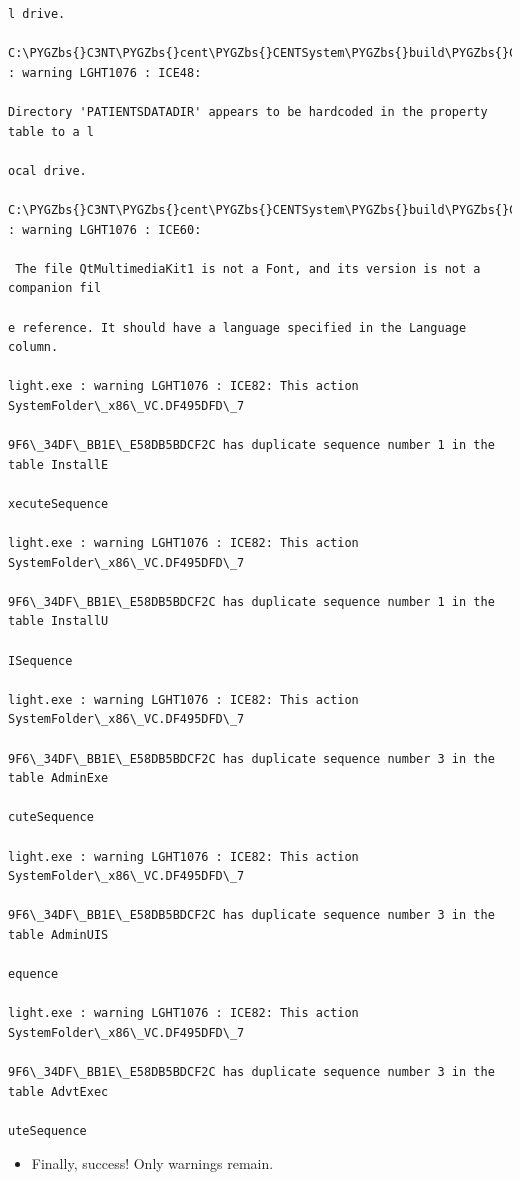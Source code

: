 \documentclass[letterpaper,10pt,english]{sphinxmanual}
\def\PYGZbs{\char`\\}
\begin{document}
\begin{enumerate}
\begin{description}
\begin{Verbatim}[commandchars=\\\{\}]
l drive.

C:\PYGZbs{}C3NT\PYGZbs{}cent\PYGZbs{}CENTSystem\PYGZbs{}build\PYGZbs{}CENTInstaller.wxs(60) : warning LGHT1076 : ICE48:

Directory 'PATIENTSDATADIR' appears to be hardcoded in the property table to a l

ocal drive.

C:\PYGZbs{}C3NT\PYGZbs{}cent\PYGZbs{}CENTSystem\PYGZbs{}build\PYGZbs{}CENTInstaller.wxs(127) : warning LGHT1076 : ICE60:

 The file QtMultimediaKit1 is not a Font, and its version is not a companion fil

e reference. It should have a language specified in the Language column.

light.exe : warning LGHT1076 : ICE82: This action SystemFolder\_x86\_VC.DF495DFD\_7

9F6\_34DF\_BB1E\_E58DB5BDCF2C has duplicate sequence number 1 in the table InstallE

xecuteSequence

light.exe : warning LGHT1076 : ICE82: This action SystemFolder\_x86\_VC.DF495DFD\_7

9F6\_34DF\_BB1E\_E58DB5BDCF2C has duplicate sequence number 1 in the table InstallU

ISequence

light.exe : warning LGHT1076 : ICE82: This action SystemFolder\_x86\_VC.DF495DFD\_7

9F6\_34DF\_BB1E\_E58DB5BDCF2C has duplicate sequence number 3 in the table AdminExe

cuteSequence

light.exe : warning LGHT1076 : ICE82: This action SystemFolder\_x86\_VC.DF495DFD\_7

9F6\_34DF\_BB1E\_E58DB5BDCF2C has duplicate sequence number 3 in the table AdminUIS

equence

light.exe : warning LGHT1076 : ICE82: This action SystemFolder\_x86\_VC.DF495DFD\_7

9F6\_34DF\_BB1E\_E58DB5BDCF2C has duplicate sequence number 3 in the table AdvtExec

uteSequence
\end{Verbatim}
\begin{itemize}
\item {} 
Finally, success! Only warnings remain.

\end{itemize}

\end{description}


\end{enumerate}
\end{document}
